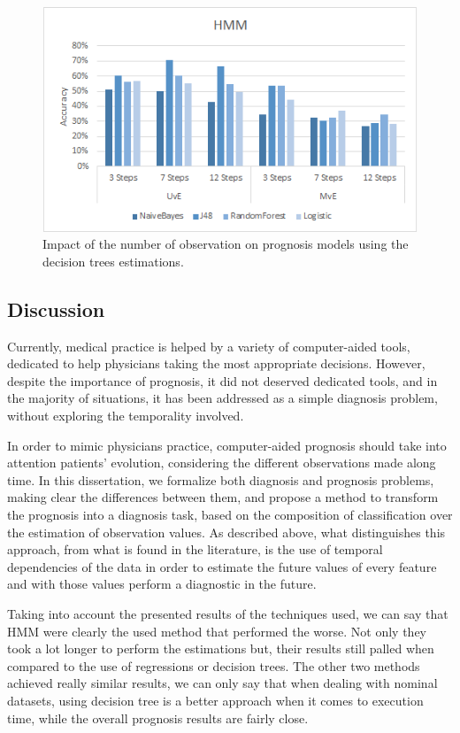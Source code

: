 \begin{figure}[h]
	\centering
	\includegraphics[width=0.49\linewidth]{Figures/impact_h_hmm.png}
	\caption{Impact of the number of observation on prognosis models using the decision trees estimations.}
	\label{fig:impactobservationshmm}
\end{figure}

\subsection{Discussion}
\label{subsection:discussion}

Currently, medical practice is helped by a variety of computer-aided tools, dedicated to help physicians taking the most
 appropriate decisions. However, despite the importance of prognosis, it did not deserved dedicated tools, and in the majority 
 of situations, it has been addressed as a simple diagnosis problem, without exploring the temporality involved.

In order to mimic physicians practice, computer-aided prognosis should take into attention patients’ evolution, considering the 
different observations made along time. In this dissertation, we formalize both diagnosis and prognosis problems, making clear the
 differences between them, and propose a method to transform the prognosis into a diagnosis task, based on the composition
 of classification over the estimation of observation values. As described above, what distinguishes this approach, from what 
 is found in the literature, is the use of temporal dependencies of the data in order to estimate the future values of every 
 feature and with those values perform a diagnostic in the future. 
 
 Taking into account the presented results of the techniques used, we can say that HMM were clearly the used method that performed
  the worse. Not only they took a lot longer to perform the estimations but, their results still palled when compared to the use of 
  regressions or decision trees. The other two methods achieved really similar results, we can only say that when dealing with nominal
  datasets, using decision tree is a better approach when it comes to execution time, while the overall prognosis results are fairly close. 
  
